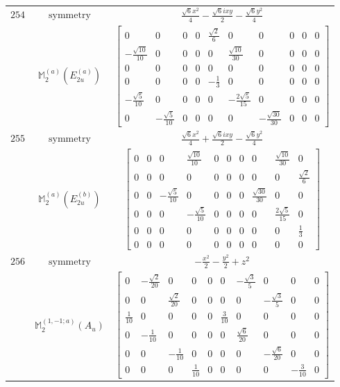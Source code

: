 \documentclass[fleqn,8pt,landscape]{jsarticle}
\begin{document}
\begin{longtable}{ccc}
$ 254 $ & $ \text{symmetry} $ & $ \frac{\sqrt{6} x^{2}}{4} - \frac{\sqrt{6} i x y}{2} - \frac{\sqrt{6} y^{2}}{4} $ \\
$  $ & $ \mathbb{M}_{2}^{(a)}(E_{2u}^{(a)}) $ & $ \begin{bmatrix} 0 & 0 & 0 & 0 & \frac{\sqrt{2}}{6} & 0 & 0 & 0 & 0 & 0 \\ - \frac{\sqrt{10}}{10} & 0 & 0 & 0 & 0 & \frac{\sqrt{10}}{30} & 0 & 0 & 0 & 0 \\ 0 & 0 & 0 & 0 & 0 & 0 & 0 & 0 & 0 & 0 \\ 0 & 0 & 0 & 0 & - \frac{1}{3} & 0 & 0 & 0 & 0 & 0 \\ - \frac{\sqrt{5}}{10} & 0 & 0 & 0 & 0 & - \frac{2 \sqrt{5}}{15} & 0 & 0 & 0 & 0 \\ 0 & - \frac{\sqrt{5}}{10} & 0 & 0 & 0 & 0 & - \frac{\sqrt{30}}{30} & 0 & 0 & 0 \end{bmatrix} $ \\ \hline
$ 255 $ & $ \text{symmetry} $ & $ \frac{\sqrt{6} x^{2}}{4} + \frac{\sqrt{6} i x y}{2} - \frac{\sqrt{6} y^{2}}{4} $ \\
$  $ & $ \mathbb{M}_{2}^{(a)}(E_{2u}^{(b)}) $ & $ \begin{bmatrix} 0 & 0 & 0 & \frac{\sqrt{10}}{10} & 0 & 0 & 0 & 0 & \frac{\sqrt{10}}{30} & 0 \\ 0 & 0 & 0 & 0 & 0 & 0 & 0 & 0 & 0 & \frac{\sqrt{2}}{6} \\ 0 & 0 & - \frac{\sqrt{5}}{10} & 0 & 0 & 0 & 0 & \frac{\sqrt{30}}{30} & 0 & 0 \\ 0 & 0 & 0 & - \frac{\sqrt{5}}{10} & 0 & 0 & 0 & 0 & \frac{2 \sqrt{5}}{15} & 0 \\ 0 & 0 & 0 & 0 & 0 & 0 & 0 & 0 & 0 & \frac{1}{3} \\ 0 & 0 & 0 & 0 & 0 & 0 & 0 & 0 & 0 & 0 \end{bmatrix} $ \\ \hline
$ 256 $ & $ \text{symmetry} $ & $ - \frac{x^{2}}{2} - \frac{y^{2}}{2} + z^{2} $ \\
$  $ & $ \mathbb{M}_{2}^{(1,-1;a)}(A_{u}) $ & $ \begin{bmatrix} 0 & - \frac{\sqrt{2}}{20} & 0 & 0 & 0 & 0 & - \frac{\sqrt{3}}{5} & 0 & 0 & 0 \\ 0 & 0 & \frac{\sqrt{2}}{20} & 0 & 0 & 0 & 0 & - \frac{\sqrt{3}}{5} & 0 & 0 \\ \frac{1}{10} & 0 & 0 & 0 & 0 & \frac{3}{10} & 0 & 0 & 0 & 0 \\ 0 & - \frac{1}{10} & 0 & 0 & 0 & 0 & \frac{\sqrt{6}}{20} & 0 & 0 & 0 \\ 0 & 0 & - \frac{1}{10} & 0 & 0 & 0 & 0 & - \frac{\sqrt{6}}{20} & 0 & 0 \\ 0 & 0 & 0 & \frac{1}{10} & 0 & 0 & 0 & 0 & - \frac{3}{10} & 0 \end{bmatrix} $ \\ \hline

\end{longtable}
\end{document}
